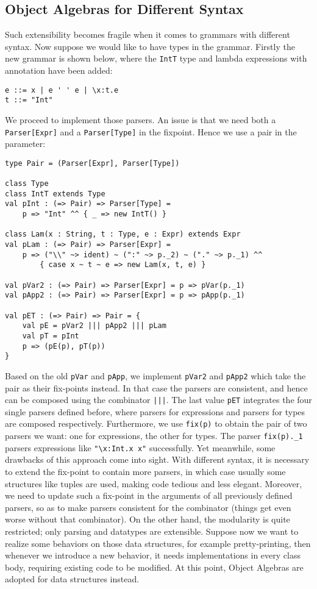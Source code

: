 \subsection{Object Algebras for Different Syntax}\label{subsec:differentsyntax}

Such extensibility becomes fragile when it comes to grammars with different syntax. Now suppose we would like to have types in the grammar. Firstly the new grammar is shown below, where the \lstinline{IntT} type and lambda expressions with annotation have been added:
\begin{lstlisting}
e ::= x | e ' ' e | \x:t.e
t ::= "Int"
\end{lstlisting}

We proceed to implement those parsers. An issue is that we need both a \lstinline{Parser[Expr]} and a \lstinline{Parser[Type]} in the fixpoint.
Hence we use a pair in the parameter:
\begin{lstlisting}
type Pair = (Parser[Expr], Parser[Type])

class Type
class IntT extends Type
val pInt : (=> Pair) => Parser[Type] =
    p => "Int" ^^ { _ => new IntT() }

class Lam(x : String, t : Type, e : Expr) extends Expr
val pLam : (=> Pair) => Parser[Expr] =
    p => ("\\" ~> ident) ~ (":" ~> p._2) ~ ("." ~> p._1) ^^
        { case x ~ t ~ e => new Lam(x, t, e) }

val pVar2 : (=> Pair) => Parser[Expr] = p => pVar(p._1)
val pApp2 : (=> Pair) => Parser[Expr] = p => pApp(p._1)

val pET : (=> Pair) => Pair = {
    val pE = pVar2 ||| pApp2 ||| pLam
    val pT = pInt
    p => (pE(p), pT(p))
}
\end{lstlisting}
Based on the old \lstinline{pVar} and \lstinline{pApp}, we implement \lstinline{pVar2} and \lstinline{pApp2} which take the pair as their fix-points instead.
In that case the parsers are consistent, and hence can be composed using the combinator \lstinline{|||}.
The last value \lstinline{pET} integrates the four single parsers defined before, where parsers for expressions and parsers for types are composed respectively. Furthermore, we use \lstinline{fix(p)} to obtain the pair of two parsers we want: one for expressions, the other for types. The parser \lstinline{fix(p)._1} parsers expressions like \lstinline{"\x:Int.x x"} successfully. Yet meanwhile, some drawbacks of this approach come into sight. With different syntax, it
is necessary to extend the fix-point to contain more parsers, in which case usually some structures like tuples are used,
making code tedious and less elegant. Moreover, we need to update such a fix-point in the arguments of all previously defined parsers, so as to make parsers consistent for the combinator (things get even worse without that combinator).
On the other hand, the modularity is quite restricted; only parsing and datatypes are extensible.
Suppose now we want to realize some behaviors on those data structures, for example pretty-printing, then whenever we introduce a new behavior,
it needs implementations in every class body, requiring existing code to be modified. At this point, Object Algebras are adopted for data structures
instead.

